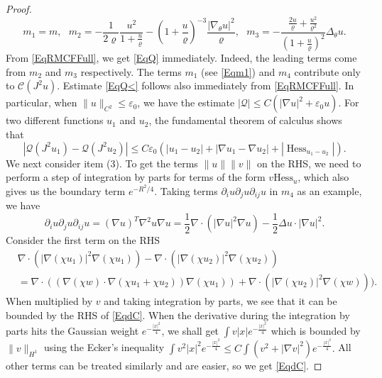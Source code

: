 \documentclass[10pt,a4paper]{amsart}
\DeclareMathOperator{\Hess}{Hess}
\newcommand{\cC}{\mathcal{C}}
\newcommand{\cQ}{\mathcal{Q}}
\newcommand{\eps}{\varepsilon}
\begin{document}
\begin{proof}
		\begin{equation*}
			m_1=m,
			\ \ \ m_2=-\frac{1}{2\varrho}\frac{u^2}{1+\frac{u}{\varrho}}-(1+\frac{u}{\varrho})^{-3}\frac{|\nabla_\theta u|^2}{\varrho},
			\ \ \ 
			m_3=-\frac{\frac{2u}{\varrho}+\frac{u^2}{\varrho^2}}{(1+\frac{u}{\varrho})^2}\Delta_\theta u.
		\end{equation*}
		From \eqref{EqRMCFFull}, we get \eqref{EqQ} immediately. Indeed, the leading terms come from $m_2$ and $m_3$ respectively. The terms $m_1$ (see \eqref{Eqm1}) and $m_4$ contribute only to $\cC(J^2u)$. Estimate \eqref{EqQ<} follows also immediately from \eqref{EqRMCFFull}. In particular, when $\|u\|_{C^{2}}\leq \eps_0$, we have the estimate
		$		|\cQ|\leq C(|\nabla u|^2+\eps_0u).
		$	
		For two different functions $u_1$ and $u_2$, the fundamental theorem of calculus shows that
		\begin{equation*}
			|\cQ(J^2u_1)-\cQ(J^2u_2)|\leq C\eps_0(|u_1-u_2|+|\nabla u_1-\nabla u_2|+|\Hess_{u_1-u_2}|).
		\end{equation*}
		We next consider item (3). To get the terms $\|u\|\|v\|$ on the RHS, we need to perform a step of integration by parts for terms of the form $v\mathrm{Hess}_u$, which also gives us the boundary term $e^{-R^2/4}$. Taking terms $\partial_iu\partial_j u\partial_{ij}u$ in $m_4$ as an example, we have $$\partial_iu\partial_j u\partial_{ij}u=(\nabla u)^T\nabla^2u\nabla u=\frac{1}{2}\nabla\cdot (|\nabla u|^2\nabla u)-\frac{1}{2}\Delta u \cdot |\nabla u|^2. $$ 
		Consider the first term on the RHS
		\begin{equation*}
			\begin{aligned}
				&\nabla\cdot (|\nabla (\chi u_1)|^2\nabla (\chi u_1))-\nabla\cdot (|\nabla (\chi u_2)|^2\nabla (\chi u_2))\\
				&=\nabla\cdot ((\nabla (\chi w)\cdot\nabla(\chi u_1+\chi u_2)) \nabla (\chi u_1))+\nabla\cdot (|\nabla (\chi u_2)|^2\nabla (\chi w))). 		
			\end{aligned}
		\end{equation*}
		When multiplied by $v$ and taking integration by parts, we see that it can be bounded by the RHS of \eqref{EqdC}. 
		When the derivative during the integration by parts hits the Gaussian weight $e^{-\frac{|x|^2}{4}}$, we shall get $\int v|x|e^{-\frac{|x|^2}{4}}$ which is bounded by $\|v\|_{H^1}$ using the Ecker's inequality $\int v^2|x|^2e^{-\frac{|x|^2}{4}}\leq C\int (v^2+|\nabla v|^2) e^{-\frac{|x|^2}{4}}. $ 
		All other terms can be treated similarly and are easier, so we get \eqref{EqdC}. 
	\end{proof}
\end{document}

